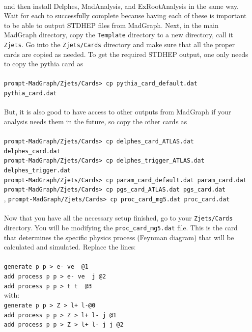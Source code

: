 \documentclass[12pt]{article}
\begin{document}
\\
and then install Delphes, MadAnalysis, and ExRootAnalysis in the same way.  Wait for each to successfully complete because having each of these is important to be able to output STDHEP files from MadGraph.  Next, in the main MadGraph directory, copy the \texttt{Template} directory to a new directory, call it \texttt{Zjets}.  Go into the \texttt{Zjets/Cards} directory and make sure that all the proper cards are copied as needed.  To get the required STDHEP output, one only needs to copy the pythia card as \\
\\
\texttt{prompt-MadGraph/Zjets/Cards> cp pythia\_card\_default.dat pythia\_card.dat}\\
\\
But, it is also good to have access to other outputs from MadGraph if your analysis needs them in the future, so copy the other cards as \\
\\
\texttt{prompt-MadGraph/Zjets/Cards> cp delphes\_card\_ATLAS.dat delphes\_card.dat }\\
\texttt{prompt-MadGraph/Zjets/Cards> cp delphes\_trigger\_ATLAS.dat delphes\_trigger.dat }\\
\texttt{prompt-MadGraph/Zjets/Cards> cp param\_card\_default.dat param\_card.dat}\\
\texttt{prompt-MadGraph/Zjets/Cards> cp pgs\_card\_ATLAS.dat pgs\_card.dat}\\,
\texttt{prompt-MadGraph/Zjets/Cards> cp proc\_card\_mg5.dat proc\_card.dat}\\
\\
Now that you have all the necessary setup finished, go to your \texttt{Zjets/Cards} directory.  You will be modifying the \texttt{proc\_card\_mg5.dat} file.  This is the card that determines the specific physics process (Feynman diagram) that will be calculated and simulated.  Replace the lines: \\
\\
\texttt{generate p p > e- ve~ @1}\\
\texttt{add process p p > e- ve~ j @2}\\
\texttt{add process p p > t t~ @3 }\\
with:\\
\texttt{generate p p > Z > l+  l-@0}\\
\texttt{add process p p > Z > l+  l- j @1}\\
\texttt{add process p p > Z > l+  l- j j @2}\\ 
\end{document}
